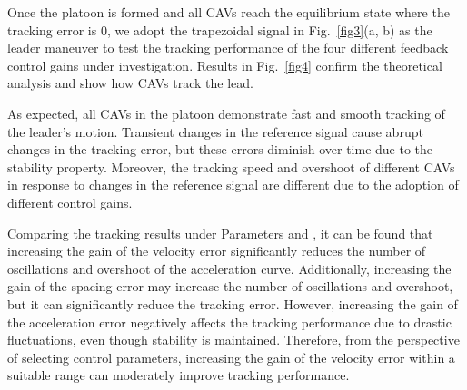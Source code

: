 \documentclass[a4paper]{cas-sc}
\begin{document}
Once the platoon is formed and all CAVs reach the equilibrium state where the tracking error is 0, we adopt the trapezoidal signal in Fig.~\ref{fig3}(a, b) as the leader maneuver to test the tracking performance of the four different feedback control gains under investigation. Results in Fig.~\ref{fig4} confirm the theoretical analysis and show how CAVs track the lead. 

As expected, all CAVs in the platoon demonstrate fast and smooth tracking of the leader's motion. Transient changes in the reference signal cause abrupt changes in the tracking error, but these errors diminish over time due to the stability property. Moreover, the tracking speed and overshoot of different CAVs in response to changes in the reference signal are different due to the adoption of different control gains.

Comparing the tracking results under Parameters \uppercase\expandafter{} and \uppercase\expandafter{}, it can be found that increasing the gain of the velocity error significantly reduces the number of oscillations and overshoot of the acceleration curve. Additionally, increasing the gain of the spacing error may increase the number of oscillations and overshoot, but it can significantly reduce the tracking error. However, increasing the gain of the acceleration error negatively affects the tracking performance due to drastic fluctuations, even though stability is maintained. Therefore, from the perspective of selecting control parameters, increasing the gain of the velocity error within a suitable range can moderately improve tracking performance.
\end{document}
